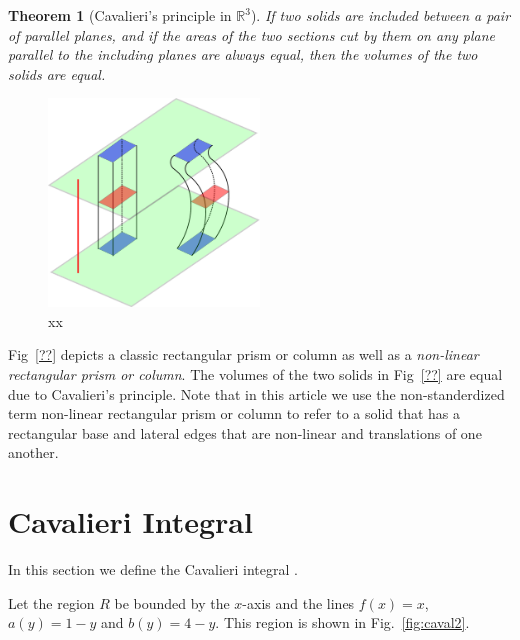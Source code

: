 \documentclass{article}
\theoremstyle{theorem}
\newtheorem{theorem}{Theorem}
\theoremstyle{definition}
\begin{document}
\begin{theorem}[Cavalieri's principle in $\mathbb{R}^3$]
If two solids are included between a pair of parallel planes, and if the areas of
the two sections cut by them on any plane parallel to the including planes are always
equal, then the volumes of the two solids are equal.
\end{theorem}

\begin{figure}[htb]
\centering
\includegraphics[width=0.5\textwidth]{cav_principle.pdf}
\caption{xx}
\label{fig:cav_principle}
\end{figure}



\noindent
Fig~\ref{??} depicts a classic rectangular prism or column as well as a \emph{non-linear rectangular prism or column}. The volumes of the two solids in Fig~\ref{??} are equal due 
to Cavalieri's principle. Note that in this article we use the non-standerdized term non-linear rectangular prism or column to refer to a solid that has a rectangular 
base and lateral edges that are non-linear and translations of one another.

\section{Cavalieri Integral}
In this section we define the Cavalieri integral \cite{ackermann12}. 


Let the region $R$ be bounded by the $x$-axis and the lines $f(x)=x$, $a(y)=1-y$ and $b(y)=4-y$. This region is shown in Fig.~\ref{fig:caval2}.\\
\end{document}
